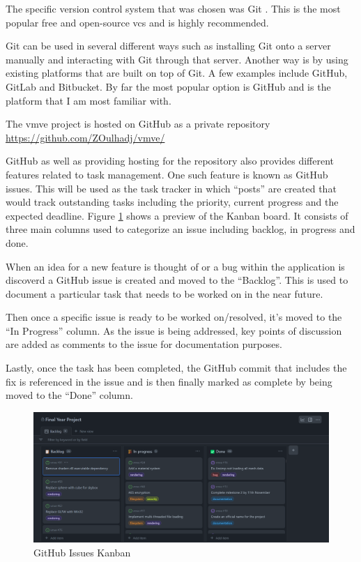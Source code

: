 \documentclass[11pt]{article}
\begin{document}
The specific version control system that was chosen was Git \cite{gitvcs}. This
is the most popular free and open-source \gls{vcs} and is highly recommended.

Git can be used in several different ways such as installing Git onto a server
manually and interacting with Git through that server. Another way is by using
existing platforms that are built on top of Git. A few examples include GitHub,
GitLab and Bitbucket. By far the most popular option is GitHub and is the
platform that I am most familiar with.


The \gls{vmve} project is hosted on GitHub as a private repository
\url{https://github.com/ZOulhadj/vmve/}


GitHub as well as providing hosting for the repository also provides different
features related to task management. One such feature is known as GitHub issues.
This will be used as the task tracker in which ``posts'' are created that would
track outstanding tasks including the priority, current progress and the
expected deadline. Figure \ref{fig:github_kanban} shows a preview of the Kanban
board. It consists of three main columns used to categorize an issue including
backlog, in progress and done. 

When an idea for a new feature is thought of or a bug within the application is
discoverd a GitHub issue is created and moved to the ``Backlog''. This is used
to document a particular task that needs to be worked on in the near future.

Then once a specific issue is ready to be worked on/resolved, it's moved to the
``In Progress'' column. As the issue is being addressed, key points of discussion
are added as comments to the issue for documentation purposes.

Lastly, once the task has been completed, the GitHub commit that includes the
fix is referenced in the issue and is then finally marked as complete by being
moved to the ``Done'' column.

\begin{figure}[h!]
  \centering
  \includegraphics[width=\textwidth]{images/github_project.png}
  \caption{GitHub Issues Kanban}
  \label{fig:github_kanban}
\end{figure}
\end{document}
